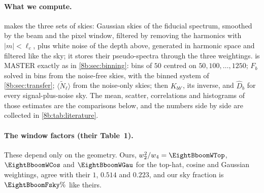 \paragraph{What we compute.}
 makes the three sets of skies: Gaussian skies of the fiducial spectrum,
smoothed by the beam and the pixel window, filtered by removing the harmonics with $|m|<\ell_c$, plus white
noise of the depth above, generated in harmonic space and filtered like the sky; it stores their
pseudo-spectra through the three weightings.  is MASTER exactly as in
\cref{8b:sec:binning}: bins of $50$ centred on $50,100,\dots,1250$; $F_b$ solved in bins from the noise-free
skies, with the binned system of \cref{8b:sec:transfer}; $\langle\widetilde N_\ell\rangle$ from the noise-only skies; then
$K_{bb'}$, its inverse, and $\widehat D_b$ for every signal-plus-noise sky. The mean, scatter, correlations and
histograms of those estimates are the comparisons below, and the numbers side by side are collected
in \cref{8b:tab:literature}.

\paragraph{The window factors (their Table~1).}
These depend only on the geometry. Ours, $w_2^2/w_4=\EightBboomWTop$, $\EightBboomWCos$ and $\EightBboomWGau$ for the
top-hat, cosine and Gaussian weightings, agree with their $1$, $0.514$ and $0.223$, and our sky fraction is
$\EightBboomFsky\%$ like theirs.

